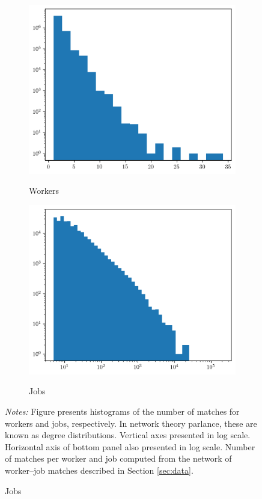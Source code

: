 \documentclass[12pt]{article}
\theoremstyle{definition}
\theoremstyle{plain}
\begin{document}
\begin{figure}
	\centering
	\caption{Distributions of Number of Matches Per Worker and Job}
	\begin{subfigure}{\textwidth}
		\centering
		\caption{Workers}
		\includegraphics[width=0.7\linewidth]{../Results/worker_degree_distribution_hist}
		\label{fig:worker_degree_distribution_hist}
	\end{subfigure}
	\begin{subfigure}{\textwidth}
		\centering
		\caption{Jobs}
		\includegraphics[width=0.7\linewidth]{../Results/job_degree_distribution_hist}
		\label{fig:job_degree_distribution_hist}
	\end{subfigure}
	\label{fig:degree_distribution_hist}
	\footnotesize\flushleft \emph{Notes:} Figure presents histograms of the number of matches for workers and jobs, respectively. In network theory parlance, these are known as degree distributions. Vertical axes presented in log scale. Horizontal axis of bottom panel also presented in log scale. Number of matches per worker and job computed from the network of worker--job matches described in Section \ref{sec:data}.
\end{figure}
\end{document}
